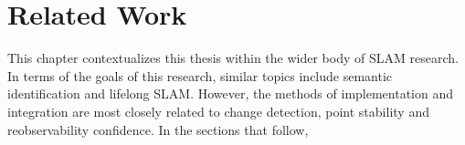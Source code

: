 \section{Related Work}
\label{sec:related_work}

This chapter contextualizes this thesis within the wider body of SLAM research. In terms of the goals of this research, similar topics include semantic identification and lifelong SLAM. However, the methods of implementation and integration are most closely related to change detection, point stability and reobservability confidence.
In the sections that follow,
% 